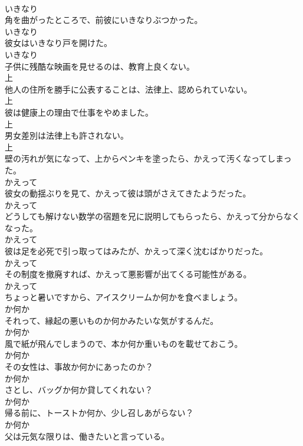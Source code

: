 \documentclass[8pt]{extreport}
\begin{document}
\begin{CJK}{UTF8}{min}
\\	いきなり	
\\	角を曲がったところで、前彼にいきなりぶつかった。	
\\	いきなり	
\\	彼女はいきなり戸を開けた。	
\\	いきなり	
\\	子供に残酷な映画を見せるのは、教育上良くない。	
\\	上	
\\	他人の住所を勝手に公表することは、法律上、認められていない。	
\\	上	
\\	彼は健康上の理由で仕事をやめました。	
\\	上	
\\	男女差別は法律上も許されない。	
\\	上	
\\	壁の汚れが気になって、上からペンキを塗ったら、かえって汚くなってしまった。	
\\	かえって	
\\	彼女の動揺ぶりを見て、かえって彼は頭がさえてきたようだった。	
\\	かえって	
\\	どうしても解けない数学の宿題を兄に説明してもらったら、かえって分からなくなった。	
\\	かえって	
\\	彼は足を必死で引っ取ってはみたが、かえって深く沈むばかりだった。	
\\	かえって	
\\	その制度を撤廃すれば、かえって悪影響が出てくる可能性がある。	
\\	かえって	
\\	ちょっと暑いですから、アイスクリームか何かを食べましょう。	
\\	か何か	
\\	それって、縁起の悪いものか何かみたいな気がするんだ。	
\\	か何か	
\\	風で紙が飛んでしまうので、本か何か重いものを載せておこう。	
\\	か何か	
\\	その女性は、事故か何かにあったのか？	
\\	か何か	
\\	さとし、バッグか何か貸してくれない？	
\\	か何か	
\\	帰る前に、トーストか何か、少し召しあがらない？	
\\	か何か	
\\	父は元気な限りは、働きたいと言っている。	

\end{CJK}
\end{document}

